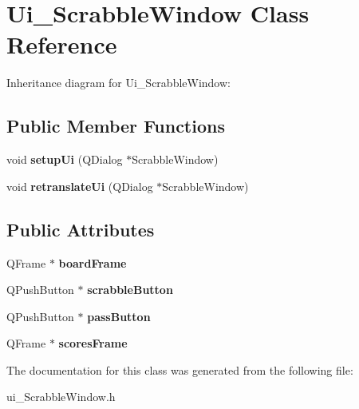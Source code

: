 \hypertarget{classUi__ScrabbleWindow}{}\section{Ui\+\_\+\+Scrabble\+Window Class Reference}
\label{classUi__ScrabbleWindow}


Inheritance diagram for Ui\+\_\+\+Scrabble\+Window\+:
\subsection*{Public Member Functions}
\begin{DoxyCompactItemize}
\item 
\mbox{\label{classUi__ScrabbleWindow_a7219597e7bf6e48594c647d0cf701bd9}} 
void {\bfseries setup\+Ui} (Q\+Dialog $\ast$Scrabble\+Window)
\item 
\mbox{\label{classUi__ScrabbleWindow_ab74d2001def95edae7ea5a6d2854a4b1}} 
void {\bfseries retranslate\+Ui} (Q\+Dialog $\ast$Scrabble\+Window)
\end{DoxyCompactItemize}
\subsection*{Public Attributes}
\begin{DoxyCompactItemize}
\item 
\mbox{\label{classUi__ScrabbleWindow_a9d3e920bd03cca9ffeff6b0f3e8dca93}} 
Q\+Frame $\ast$ {\bfseries board\+Frame}
\item 
\mbox{\label{classUi__ScrabbleWindow_abfae89474f6766ad0daee78e18ad3916}} 
Q\+Push\+Button $\ast$ {\bfseries scrabble\+Button}
\item 
\mbox{\label{classUi__ScrabbleWindow_a1542148827ac539ce2f38f0d153c6b87}} 
Q\+Push\+Button $\ast$ {\bfseries pass\+Button}
\item 
\mbox{\label{classUi__ScrabbleWindow_a4495b65d3de6e9f1a374732e8c0000ae}} 
Q\+Frame $\ast$ {\bfseries scores\+Frame}
\end{DoxyCompactItemize}


The documentation for this class was generated from the following file\+:\begin{DoxyCompactItemize}
\item 
ui\+\_\+\+Scrabble\+Window.\+h\end{DoxyCompactItemize}
